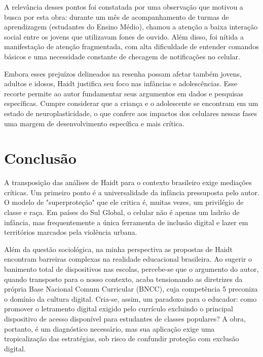 \documentclass[portuguese]{textolivre}
\begin{document}
A relevância desses pontos foi constatada por uma observação que motivou a busca por esta obra: durante um mês de acompanhamento de turmas de aprendizagem (estudantes do Ensino Médio), chamou a atenção a baixa interação social entre os jovens que utilizavam fones de ouvido. Além disso, foi nítida a manifestação de atenção fragmentada, com alta dificuldade de entender comandos básicos e uma necessidade constante de checagem de notificações no celular.

Embora esses prejuízos delineados na resenha possam afetar também jovens, adultos e idosos, Haidt justifica seu foco nas infâncias e adolescências. Esse recorte permite ao autor fundamentar seus argumentos em dados e pesquisas específicas. Cumpre considerar que a criança e o adolescente se encontram em um estado de neuroplasticidade, o que confere aos impactos dos celulares nessas fases uma margem de desenvolvimento específica e mais crítica.

\vspace{-2pt}
\section{Conclusão}\label{sec-conduta}
A transposição das análises de Haidt para o contexto brasileiro exige mediações críticas. Um primeiro ponto é a universalidade da infância pressuposta pelo autor. O modelo de "superproteção" que ele critica é, muitas vezes, um privilégio de classe e raça. Em países do Sul Global, o celular não é apenas um ladrão de infância, mas frequentemente a única ferramenta de inclusão digital e lazer em territórios marcados pela violência urbana.

Além da questão sociológica, na minha perspectiva as propostas de Haidt encontram barreiras complexas na realidade educacional brasileira. Ao sugerir o banimento total de dispositivos nas escolas, percebe-se que o argumento do autor, quando transposto para o nosso contexto, acaba tensionando as diretrizes da própria Base Nacional Comum Curricular (BNCC), cuja competência 5 preconiza o domínio da cultura digital. Cria-se, assim, um paradoxo para o educador: como promover o letramento digital exigido pelo currículo excluindo o principal dispositivo de acesso disponível para estudantes de classes populares? A obra, portanto, é um diagnóstico necessário, mas sua aplicação exige uma tropicalização das estratégias, sob risco de confundir proteção com exclusão digital.


\vspace{-2pt}
\printbibliography\label{sec-bib}
\end{document}
